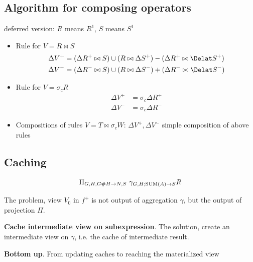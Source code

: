 \documentclass[a4paper]{report}
\begin{document}
\subsection{Algorithm for composing operators}
deferred version: $R$ means $R^1$, $S$ means $S^1$
\begin{itemize}
\item Rule for $V = R \bowtie S$
\begin{align*}
\Delta V^+ &= (\Delta R^+ \bowtie S) \cup (R \bowtie \Delta S^+) - (\Delta R^+ \bowtie \Delat S^+)\\
\Delta V^- &= (\Delta R^- \bowtie S) \cup (R \bowtie \Delta S^-) + (\Delta R^- \bowtie \Delat S^-)
\end{align*}
\item Rule for $V = \sigma_c R$
\begin{align*}
\Delta V^+ &= \sigma_c \Delta R^+\\
\Delta V^- &= \sigma_c \Delta R^-
\end{align*}
\item Compositions of rules $V = T\bowtie \sigma_c W$: $\Delta V^+, \Delta V^-$ simple composition of above rules 
\end{itemize}
\subsection{Caching}
\begin{align*}
\Pi_{G, H, G\#H\rightarrow N, S}\ \gamma_{G, H; \text{SUM}(A) \rightarrow S} R
\end{align*}

The problem, view $V_0$ in $f^+$ is not output of aggregation $\gamma$, but the output of projection $\Pi$. 

\textbf{Cache intermediate view on subexpression}. The solution, create an intermediate view on $\gamma$, i.e. the cache of intermediate result.

\textbf{Bottom up}. From updating caches to reaching the materialized view
\end{document}
